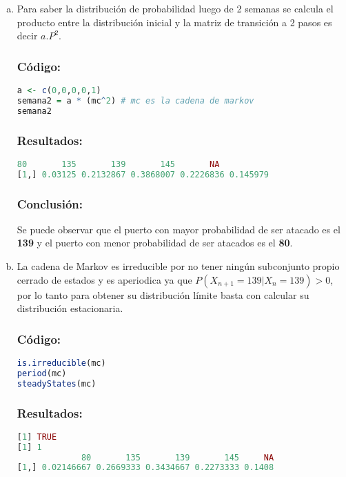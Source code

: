 \documentclass{article}
\begin{document}
\begin{enumerate}[(a)] %
\item Para saber la distribución de probabilidad luego de 2 semanas se calcula el producto entre la distribución inicial y la matriz de transición a 2 pasos es decir $a . P^{2}$.

\subsubsection*{Código:}
\begin{lstlisting}[language=R]
a <- c(0,0,0,0,1)
semana2 = a * (mc^2) # mc es la cadena de markov
semana2
\end{lstlisting}

\subsubsection*{Resultados:}
\begin{lstlisting}[language=R]
          80       135       139       145       NA
[1,] 0.03125 0.2132867 0.3868007 0.2226836 0.145979
\end{lstlisting}

\subsubsection*{Conclusión:}
Se puede observar que el puerto con mayor probabilidad de ser atacado es el \textbf{139} y el puerto con menor probabilidad de ser atacados es el \textbf{80}.

\item La cadena de Markov es irreducible por no tener ningún subconjunto propio cerrado de estados y es aperiodica ya que $P(X_{n+1} = 139 | X_n = 139) > 0$, por lo tanto para obtener su distribución límite basta con calcular su distribución estacionaria.

\subsubsection*{Código:}
\begin{lstlisting}[language=R]
is.irreducible(mc)
period(mc)
steadyStates(mc)
\end{lstlisting}

\subsubsection*{Resultados:}
\begin{lstlisting}[language=R]
[1] TRUE
[1] 1
             80       135       139       145     NA
[1,] 0.02146667 0.2669333 0.3434667 0.2273333 0.1408
\end{lstlisting}

\end{enumerate}
\end{document}
